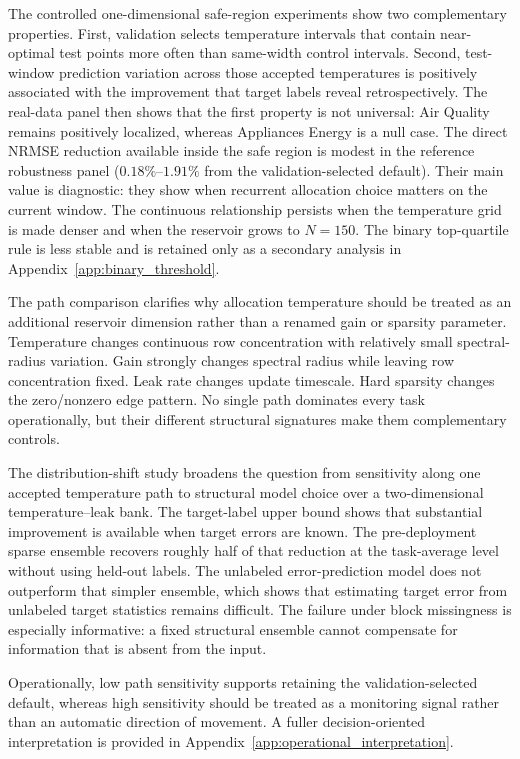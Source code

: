 \documentclass[preprint,12pt,authoryear]{elsarticle}
\begin{document}
The controlled one-dimensional safe-region experiments show two complementary properties. First, validation selects temperature intervals that contain near-optimal test points more often than same-width control intervals. Second, test-window prediction variation across those accepted temperatures is positively associated with the improvement that target labels reveal retrospectively. The real-data panel then shows that the first property is not universal: Air Quality remains positively localized, whereas Appliances Energy is a null case. The direct NRMSE reduction available inside the safe region is modest in the reference robustness panel ($0.18\%$--$1.91\%$ from the validation-selected default). Their main value is diagnostic: they show when recurrent allocation choice matters on the current window. The continuous relationship persists when the temperature grid is made denser and when the reservoir grows to $N=150$. The binary top-quartile rule is less stable and is retained only as a secondary analysis in Appendix~\ref{app:binary_threshold}.

The path comparison clarifies why allocation temperature should be treated as an additional reservoir dimension rather than a renamed gain or sparsity parameter. Temperature changes continuous row concentration with relatively small spectral-radius variation. Gain strongly changes spectral radius while leaving row concentration fixed. Leak rate changes update timescale. Hard sparsity changes the zero/nonzero edge pattern. No single path dominates every task operationally, but their different structural signatures make them complementary controls.

The distribution-shift study broadens the question from sensitivity along one accepted temperature path to structural model choice over a two-dimensional temperature--leak bank. The target-label upper bound shows that substantial improvement is available when target errors are known. The pre-deployment sparse ensemble recovers roughly half of that reduction at the task-average level without using held-out labels. The unlabeled error-prediction model does not outperform that simpler ensemble, which shows that estimating target error from unlabeled target statistics remains difficult. The failure under block missingness is especially informative: a fixed structural ensemble cannot compensate for information that is absent from the input.

Operationally, low path sensitivity supports retaining the validation-selected default, whereas high sensitivity should be treated as a monitoring signal rather than an automatic direction of movement. A fuller decision-oriented interpretation is provided in Appendix~\ref{app:operational_interpretation}.
\end{document}
